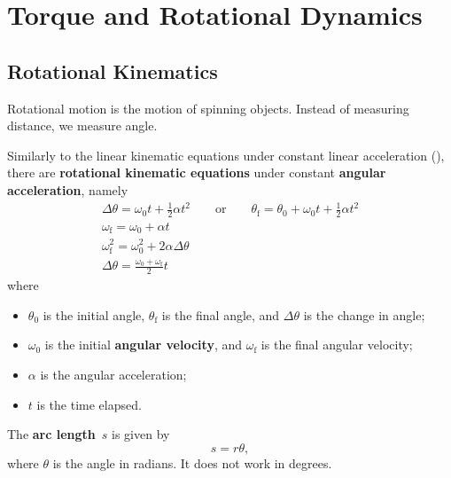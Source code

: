 \chapter{Torque and Rotational Dynamics}


\section{Rotational Kinematics}

Rotational motion is the motion of spinning objects.
Instead of measuring distance, we measure angle.

Similarly to the linear kinematic equations under constant linear
acceleration (),
there are \textbf{rotational kinematic equations} under constant
\textbf{angular acceleration},
namely
\begin{subequations}
    \begin{gather}
        {
            \Delta{\theta} = \omega_0 t + \frac{1}{2} \alpha t^2
            \qquad \mathrm{or} \qquad
            \theta_\mathrm{f} = \theta_0 + \omega_0 t + \frac{1}{2} \alpha t^2
        } \\
        \omega_\mathrm{f} = \omega_0 + \alpha t \\
        \omega_\mathrm{f}^2 = \omega_0^2 + 2 \alpha \Delta{\theta} \\
        \Delta{\theta} = \frac{\omega_0 + \omega_\mathrm{f}}{2} t
    \end{gather}
\end{subequations}
where
\begin{itemize}
    \item \(\theta_0\) is the initial angle,
        \(\theta_\mathrm{f}\) is the final angle,
        and \(\Delta{\theta}\) is the change in angle;
    \item \(\omega_0\) is the initial \textbf{angular velocity},
        and \(\omega_\mathrm{f}\) is the final angular velocity;
    \item \(\alpha\) is the angular acceleration;
    \item \(t\) is the time elapsed.
\end{itemize}

The \textbf{arc length}~\(s\) is given by
\begin{equation}
    s = r \theta,
\end{equation}
where \(\theta\) is the angle in radians.
It does not work in degrees.

